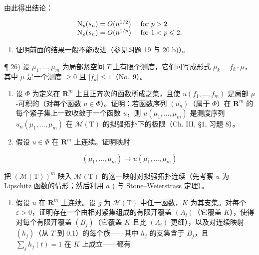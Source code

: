 由此得出结论：

\[
\begin{array}{l l} \mathrm{N} _ {p} (s _ {n}) = O (n ^ {1 / 2}) & \text { for } p > 2 \\ \mathrm{N} _ {p} (s _ {n}) = O (n ^ {1 / p}) & \text { for } 1 <   p \leqslant 2. \end{array}
\]

\begin{enumerate}
\def\labelenumi{\alph{enumi})}
\setcounter{enumi}{2}
\tightlist
\item
  证明前面的结果一般不能改进（参见习题 19 与 20 b)）。
\end{enumerate}

¶ 26) 设 \(\mu_1, \ldots, \mu_m\) 为局部紧空间 \(T\) 上有限个测度，它们可写成形式 \(\mu_k = f_k \cdot \mu\)，其中 \(\mu\) 是一个测度 \(\geqslant 0\) 且 \(|f_k| \leqslant 1\)（No.~9）。

\begin{enumerate}
\def\labelenumi{\alph{enumi})}
\item
  设 \(\Phi\) 为定义在 \(\mathbf{R}^m\) 上且正齐次的函数所成之集，且使 \(u(f_1, \ldots, f_m)\) 是局部 \(\mu\) -可积的（对每个函数 \(u \in \Phi\)）。证明：若函数序列 \((u_n)\)（属于 \(\Phi\)）在 \(\mathbf{R}^m\) 的每个紧子集上一致收敛于一个函数 \(u\)，则 \(u(\mu_1, \ldots, \mu_m)\) 是测度序列 \(u_n(\mu_1, \ldots, \mu_m)\) 在 \(\mathcal{M}(\mathrm{T})\) 的拟强拓扑下的极限（Ch. III, §1, 习题 8）。
\item
  假设 \(u \in \Phi\) 在 \(\mathbf{R}^m\) 上连续。证明映射
\end{enumerate}

\[
(\mu_ {1}, \dots , \mu_ {m}) \mapsto u (\mu_ {1}, \dots , \mu_ {m})
\]

把 \((\mathcal{M}(\mathrm{T}))^m\) 映入 \(\mathcal{M}(\mathrm{T})\) 的这一映射对拟强拓扑连续（先考察 \(u\) 为 Lipschitz 函数的情形；然后利用 \(a\) ) 与 Stone--Weierstrass 定理）。

\begin{enumerate}
\def\labelenumi{\alph{enumi})}
\setcounter{enumi}{2}
\tightlist
\item
  假设 \(u\) 在 \(\mathbf{R}^m\) 上连续。设 \(g\) 为 \(\mathcal{H}(\mathrm{T})\) 中任一函数，\(K\) 为其支集。对每个 \(\varepsilon > 0\)，证明存在一个由相对紧集组成的有限开覆盖 \((A_i)\)（它覆盖 \(K\)），使得对每个有限开覆盖 \((B_j)\)（它覆盖 \(K\) 且比 \((A_i)\) 更细），以及对连续映射 \((h_j)\)（从 \(T\) 到 {}0,1{}）的每个族——其中 \(h_j\) 的支集含于 \(B_j\)，且 \(\sum_{j} h_j(t) = 1\) 在 \(K\) 上成立——都有
\end{enumerate}

